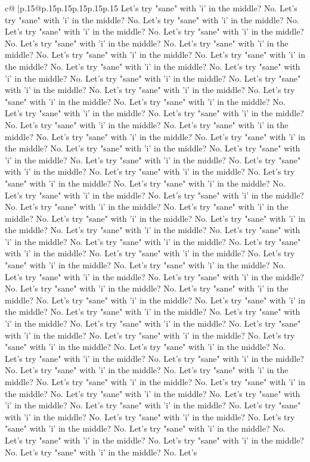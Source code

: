 \documentclass{article}
\begin{document}
{\begin{supertabular}{c@{$\;$}|p{.15\linewidth}@{}p{.15\linewidth}p{.15\linewidth}p{.15\linewidth}p{.15\linewidth}p{.15\linewidth}}
{{{Let's try "sane" with 'i' in the middle? No. Let's try "sane" with 'i' in the middle? No. Let's try "sane" with 'i' in the middle? No. Let's try "sane" with 'i' in the middle? No. Let's try "sane" with 'i' in the middle? No. Let's try "sane" with 'i' in the middle? No. Let's try "sane" with 'i' in the middle? No. Let's try "sane" with 'i' in the middle? No. Let's try "sane" with 'i' in the middle? No. Let's try "sane" with 'i' in the middle? No. Let's try "sane" with 'i' in the middle? No. Let's try "sane" with 'i' in the middle? No. Let's try "sane" with 'i' in the middle? No. Let's try "sane" with 'i' in the middle? No. Let's try "sane" with 'i' in the middle? No. Let's try "sane" with 'i' in the middle? No. Let's try "sane" with 'i' in the middle? No. Let's try "sane" with 'i' in the middle? No. Let's try "sane" with 'i' in the middle? No. Let's try "sane" with 'i' in the middle? No. Let's try "sane" with 'i' in the middle? No. Let's try "sane" with 'i' in the middle? No. Let's try "sane" with 'i' in the middle? No. Let's try "sane" with 'i' in the middle? No. Let's try "sane" with 'i' in the middle? No. Let's try "sane" with 'i' in the middle? No. Let's try "sane" with 'i' in the middle? No. Let's try "sane" with 'i' in the middle? No. Let's try "sane" with 'i' in the middle? No. Let's try "sane" with 'i' in the middle? No. Let's try "sane" with 'i' in the middle? No. Let's try "sane" with 'i' in the middle? No. Let's try "sane" with 'i' in the middle? No. Let's try "sane" with 'i' in the middle? No. Let's try "sane" with 'i' in the middle? No. Let's try "sane" with 'i' in the middle? No. Let's try "sane" with 'i' in the middle? No. Let's try "sane" with 'i' in the middle? No. Let's try "sane" with 'i' in the middle? No. Let's try "sane" with 'i' in the middle? No. Let's try "sane" with 'i' in the middle? No. Let's try "sane" with 'i' in the middle? No. Let's try "sane" with 'i' in the middle? No. Let's try "sane" with 'i' in the middle? No. Let's try "sane" with 'i' in the middle? No. Let's try "sane" with 'i' in the middle? No. Let's try "sane" with 'i' in the middle? No. Let's try "sane" with 'i' in the middle? No. Let's try "sane" with 'i' in the middle? No. Let's try "sane" with 'i' in the middle? No. Let's try "sane" with 'i' in the middle? No. Let's try "sane" with 'i' in the middle? No. Let's try "sane" with 'i' in the middle? No. Let's try "sane" with 'i' in the middle? No. Let's try "sane" with 'i' in the middle? No. Let's try "sane" with 'i' in the middle? No. Let's try "sane" with 'i' in the middle? No. Let's try "sane" with 'i' in the middle? No. Let's try "sane" with 'i' in the middle? No. Let's try "sane" with 'i' in the middle? No. Let's try "sane" with 'i' in the middle? No. Let's try "sane" with 'i' in the middle? No. Let's try "sane" with 'i' in the middle? No. Let's try "sane" with 'i' in the middle? No. Let's try "sane" with 'i' in the middle? No. Let's try "sane" with 'i' in the middle? No. Let's try "sane" with 'i' in the middle? No. Let's try "sane" with 'i' in the middle? No. Let's try "sane" with 'i' in the middle? No. Let's try "sane" with 'i' in the middle? No. Let's try "sane" with 'i' in the middle? No. Let's }}}
\end{supertabular}}
\end{document}
